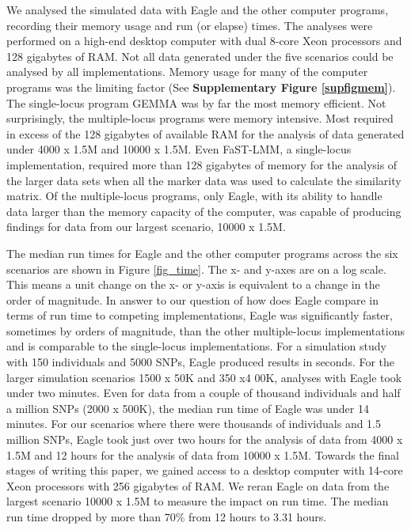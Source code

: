 \documentclass{nature}
\begin{document}
We analysed the simulated data with Eagle and the other computer programs, recording their memory usage and 
run (or elapse) times. The analyses were performed on a high-end desktop computer with dual 8-core Xeon processors and 128 gigabytes of RAM. Not all data generated under the five scenarios could be analysed by all implementations. Memory usage 
for many of the computer programs was the limiting factor (See {\bf Supplementary Figure \ref{supfigmem}}).  The single-locus program GEMMA was by 
far the most memory efficient. Not surprisingly, the multiple-locus programs were memory intensive. Most required in 
excess of the 128 gigabytes of available RAM for the analysis of data generated under 4000 x 1.5M and 10000 x 1.5M.  
Even FaST-LMM, a single-locus
implementation, required more than 128 gigabytes of memory for the analysis of the larger data sets 
when all the marker data was used to calculate the similarity matrix. Of the multiple-locus programs, only Eagle,  
with its ability to handle data larger than the memory capacity of the computer, was capable of producing findings 
for data from our largest scenario, 10000 x 1.5M. 


The median run times for Eagle and the other computer programs across the six scenarios are shown in Figure \ref{fig_time}. 
The x- and y-axes are on a log scale.  This means a unit change on the x- or y-axis is equivalent to a change in the order of magnitude.  In answer to our question of how does Eagle compare in terms of run time to competing implementations, 
Eagle was significantly faster, sometimes by orders of magnitude,  than the other multiple-locus
 implementations and is comparable to the single-locus implementations. For a simulation study with 150 individuals and 
 5000 SNPs, Eagle produced results in seconds.  For the larger simulation scenarios 1500 x  50K and 350 x4 00K, 
 analyses with Eagle took under two minutes. Even for data from a couple of thousand individuals and half a million 
 SNPs (2000 x 500K), the median run time of Eagle was under 14 minutes. For our scenarios where there 
 were thousands of individuals and 1.5 million SNPs, Eagle took just over two hours for the analysis of data from 
 4000 x 1.5M and  12 hours for the analysis of data from 10000 x 1.5M. 
 Towards the final stages of writing this paper, 
 we gained access to a desktop computer with 14-core Xeon processors with 256 gigabytes of RAM. We reran Eagle on data from the largest
  scenario 10000 x 1.5M to measure the impact on run time. The median run time dropped by more than 70\% 
  from 12 hours to 3.31 hours. 
 
\end{document}
